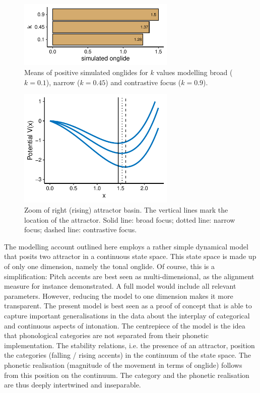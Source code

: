 \begin{figure}[htbp]
\begin{center}
\includegraphics[width=7.5cm]{figures/ch6/positive_means_within.pdf}
\caption{Means of positive simulated onglides for $k$ values modelling broad ($k=0.1$), narrow ($k=0.45$) and contrastive focus ($k=0.9$).}
\label{fig:simulation_means_br_na_co}
\end{center}
\end{figure}

\begin{figure}[htbp]
\begin{center}
\includegraphics[width=7.5cm]{figures/ch6/right_basin.pdf}
\caption[Zoom of right (rising) attractor basin.]{Zoom of right (rising) attractor basin. The vertical lines mark the location of the attractor. Solid line: broad focus; dotted line: narrow focus; dashed line: contrastive focus.}
\label{fig:right_basin}
\end{center}
\end{figure}

The modelling account outlined here employs a rather simple dynamical model that posits two attractor in a continuous state space. This state space is made up of only one dimension, namely the tonal onglide. Of course, this is a simplification: Pitch accents are best seen as multi-dimensional, as the alignment measure for instance demonstrated. A full model would include all relevant parameters. However, reducing the model to one dimension makes it more transparent. The present model is best seen as a proof of concept that is able to capture important generalisations in the data about the interplay of categorical and continuous aspects of intonation. The centrepiece of the model is the idea that phonological categories are not separated from their phonetic implementation. The stability relations, i.e. the presence of an attractor, position the categories (falling / rising accents) in the continuum of the state space. The phonetic realisation (magnitude of the movement in terms of onglide) follows from this position on the continuum. The category and the phonetic realisation are thus deeply intertwined and inseparable.

